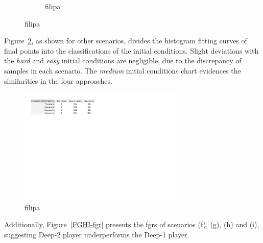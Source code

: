 \begin{figure}[h]
\begin{subfigure}[h]{0.32\textwidth}
                \caption{filipa}
                \label{fig:FGHIeasy}
        \end{subfigure}
        \caption{filipa}
        \label{fig:FGHI-CH}
\end{figure}

Figure~\ref{fig:FGHI-CH}, as shown for other scenarios, divides the histogram fitting curves of final points into the classifications of the initial conditions.
Slight deviations with the \emph{hard} and \emph{easy} initial conditions are negligible, due to the discrepancy of samples in each scenario.
The \emph{medium} initial conditions chart evidences the similarities in the four approaches.

\begin{figure}[h!]
  \centering
    \includegraphics[width=0.7\textwidth]{./img/4/FGHI-fgr}
  \caption{filipa}
\label{fig:FGHI-fgr}
\end{figure}

Additionally, Figure~\ref{FGHI-fgr} presents the \acp{fgr} of scenarios (f), (g), (h) and (i), suggesting Deep-2 player underperforms the Deep-1 player.


